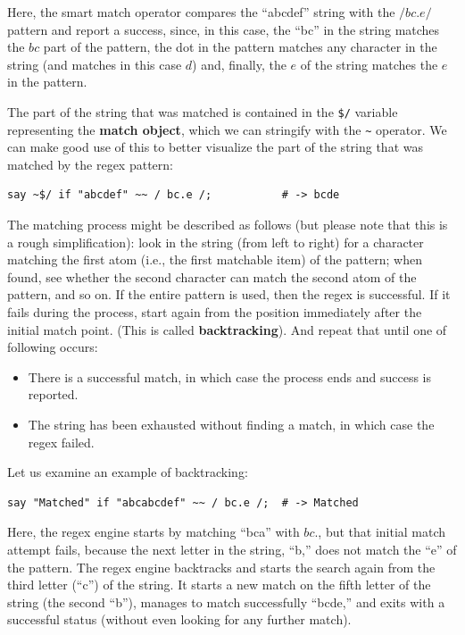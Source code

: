 Here, the smart match operator compares the ``abcdef'' string 
with the $/bc.e/$ pattern and report a success, since, in 
this case, the ``bc'' in the string matches the $bc$ part of 
the pattern, the dot in the pattern matches any character in the string (and matches in this case $d$) and, finally, the $e$ of 
the string matches the $e$ in the pattern.

The part of the string that was matched is contained in the 
\verb'$/' variable representing the {\bf match object}, which we 
can stringify with the \verb'~' operator. We can make good 
use of this to better visualize the part of the string 
that was matched by the regex pattern:

\begin{verbatim}
say ~$/ if "abcdef" ~~ / bc.e /;           # -> bcde
\end{verbatim}
%



The matching process might be described as follows (but please 
note that this is a rough simplification): look 
in the string (from left to right) for a character matching 
the first atom (i.e., the first matchable item) of the 
pattern; when found, see whether the second 
character can match the second atom of the pattern, and so on. 
If the entire pattern is used, then the regex is successful.
If it fails during the process, start again from the position 
immediately after the initial match point. (This is called 
{\bf backtracking}). And repeat that until one of following 
occurs:

\begin{itemize}
\item There is a successful match, in which case the process 
ends and success is reported. 
\item The string has been exhausted without finding a match, 
in which case the regex failed.
\end{itemize}

Let us examine an example of backtracking:
\begin{verbatim}
say "Matched" if "abcabcdef" ~~ / bc.e /;  # -> Matched
\end{verbatim}
%
Here, the regex engine starts by matching ``bca'' with 
$bc.$, but that initial match attempt fails, because the 
next letter in the string, ``b,'' does not match the ``e'' 
of the pattern. The regex engine backtracks and starts the 
search again from the third letter (``c'') of the string. 
It starts a new match on the fifth letter of the string 
(the second ``b''), manages to match successfully ``bcde,'' and 
exits with a successful status (without even looking for any 
further match).

